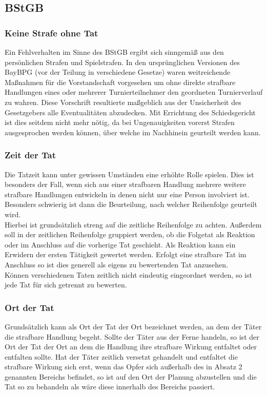 \documentclass[a4paper, 12pt]{article}
\begin{document}
\subsection{BStGB}
\subsubsection{Keine Strafe ohne Tat}
Ein Fehlverhalten im Sinne des BStGB ergibt sich sinngemäß aus den persönlichen Strafen und Spielstrafen. In den ursprünglichen Versionen des BayBPG (vor der Teilung in verschiedene Gesetze) waren weitreichende Maßnahmen für die Vorstandschaft vorgesehen um ohne direkte strafbare Handlungen eines oder mehrerer Turnierteilnehmer den geordneten Turnierverlauf zu wahren. Diese Vorschrift resultierte maßgeblich aus der Unsicherheit des Gesetzgebers alle Eventualitäten abzudecken. Mit Errichtung des Schiedsgericht ist dies seitdem nicht mehr nötig, da bei Ungenauigkeiten vorerst Strafen ausgesprochen werden können, über welche im Nachhinein geurteilt werden kann.
\subsubsection{Zeit der Tat}
Die Tatzeit kann unter gewissen Umständen eine erhöhte Rolle spielen. Dies ist besonders der Fall, wenn sich aus einer strafbaren Handlung mehrere weitere strafbare Handlungen entwickeln in denen nicht nur eine Person involviert ist. Besonders schwierig ist dann die Beurteilung, nach welcher Reihenfolge geurteilt wird.\\
Hierbei ist grundsätzlich streng auf die zeitliche Reihenfolge zu achten. Außerdem soll in der zeitlichen Reihenfolge gruppiert werden, ob die Folgetat als Reaktion oder im Anschluss auf die vorherige Tat geschieht. Als Reaktion kann ein Erwidern der ersten Tätigkeit gewertet werden. Erfolgt eine strafbare Tat im Anschluss so ist dies generell als eigens zu bewertenden Tat anzusehen.\\
Können verschiedenen Taten zeitlich nicht eindeutig eingeordnet werden, so ist jede Tat für sich getrennt zu bewerten.
\subsubsection{Ort der Tat}
Grundsätzlich kann als Ort der Tat der Ort bezeichnet werden, an dem der Täter die strafbare Handlung begeht. Sollte der Täter aus der Ferne handeln, so ist der Ort der Tat der Ort an dem die Handlung ihre strafbare Wirkung entfaltet oder entfalten sollte. Hat der Täter zeitlich versetzt gehandelt und entfaltet die strafbare Wirkung sich erst, wenn das Opfer sich außerhalb des in Absatz 2 genannten Bereichs befindet, so ist auf den Ort der Planung abzustellen und die Tat so zu behandeln als wäre diese innerhalb des Bereichs passiert.
\end{document}
